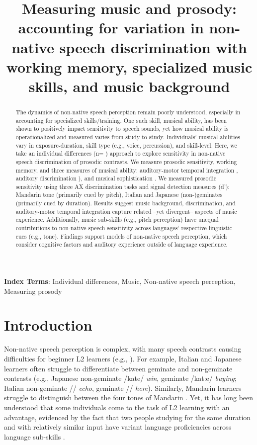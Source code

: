 \documentclass[a4paper]{article}
\title{Measuring music and prosody: accounting for variation in non-native speech discrimination with working memory, specialized music skills, and music background}
\newcommand{\livedata}[2]{%
    \DTLfetch{#1}{Statistic}{#2}{Value}%
}
\begin{document}
\maketitle
% 
\begin{abstract}
The dynamics of non-native speech perception remain poorly understood, especially in accounting for specialized skills/training. One such skill, musical ability, has been shown to positively impact sensitivity to speech sounds, yet how musical ability is operationalized and measured varies from study to study. Individuals’ musical abilities vary in exposure-duration, skill type (e.g., voice, percussion), and skill-level. Here, we take an individual differences (n=\livedata{partrem}{kept_participants}) approach to explore sensitivity in non-native speech discrimination of prosodic contrasts. We measure prosodic sensitivity, working memory, and three measures of musical ability: auditory-motor temporal integration \cite{Kachlicka_Saito_Tierney_2019}, auditory discrimination \cite[MET]{Wallentin_Nielsen_Friis-Olivarius_Vuust_Vuust_2010}), and musical sophistication \cite[Goldsmiths-MSI]{Müllensiefen_Gingras_Musil_Stewart_2014}. We measured prosodic sensitivity using three AX discrimination tasks and signal detection measures (d'): Mandarin tone (primarily cued by pitch), Italian and Japanese (non-)geminates (primarily cued by duration). Results suggest music background, discrimination, and auditory-motor temporal integration capture related –yet divergent– aspects of music experience. Additionally, music sub-skills (e.g., pitch perception) have unequal contributions to non-native speech sensitivity across languages' respective linguistic cues (e.g., tone). Findings support models of non-native speech perception, which consider cognitive factors and auditory experience outside of language experience.

\end{abstract}
\noindent\textbf{Index Terms}:  Individual differences, Music, Non-native speech perception, Measuring prosody
\noindent\section{Introduction}

Non-native speech perception is complex, with many speech contrasts causing difficulties for beginner L2 learners (e.g., \cite{Flege_95,Flege_2021}). For example, Italian and Japanese learners often struggle to differentiate between geminate and non-geminate contrasts (e.g., Japanese non-geminate /kate/ \textit{win}, geminate /kat:e/ \textit{buying}; Italian non-geminate // \textit{echo}, geminate // \textit{here})\cite{Tsukada_Cox_Hajek_Hirata_2017}. Similarly, Mandarin learners struggle to distinguish between the four tones of Mandarin \cite{Pelzl_2021}. Yet, it has long been understood that some individuals come to the task of L2 learning with an advantage, evidenced by the fact that two people studying for the same duration and with relatively similar input have variant language proficiencies across language sub-skills \cite{Zheng_2021}. 
\end{document}
